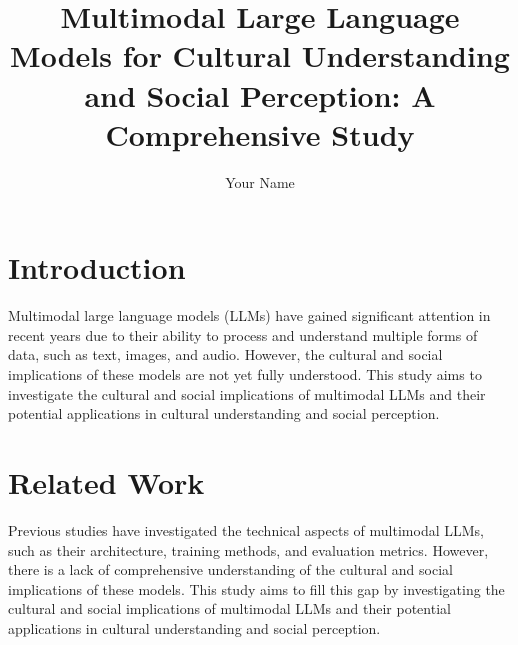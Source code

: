 \documentclass{article}
\begin{document}
\title{Multimodal Large Language Models for Cultural Understanding and Social Perception: A Comprehensive Study}

\author{Your Name}

\maketitle


\section{Introduction}

Multimodal large language models (LLMs) have gained significant attention in recent years due to their ability to process and understand multiple forms of data, such as text, images, and audio. However, the cultural and social implications of these models are not yet fully understood. This study aims to investigate the cultural and social implications of multimodal LLMs and their potential applications in cultural understanding and social perception.

\section{Related Work}

Previous studies have investigated the technical aspects of multimodal LLMs, such as their architecture, training methods, and evaluation metrics. However, there is a lack of comprehensive understanding of the cultural and social implications of these models. This study aims to fill this gap by investigating the cultural and social implications of multimodal LLMs and their potential applications in cultural understanding and social perception.
\end{document}

